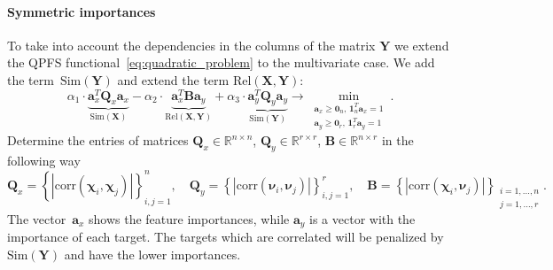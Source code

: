 \documentclass[12pt,twoside]{article}
\newcommand{\ba}{\mathbf{a}}
\newcommand{\bY}{\mathbf{Y}}
\newcommand{\bX}{\mathbf{X}}
\newcommand{\bB}{\mathbf{B}}
\newcommand{\bQ}{\mathbf{Q}}
\newcommand{\bbR}{\mathbb{R}}
\newcommand{\bchi}{\boldsymbol{\chi}}
\newcommand{\bnu}{\boldsymbol{\nu}}
\newcommand{\bOne}{\boldsymbol{1}}
\newcommand{\bZero}{\boldsymbol{0}}
\begin{document}
\paragraph{Symmetric importances}

To take into account the dependencies in the columns of the matrix $\bY$ we extend the QPFS functional~\eqref{eq:quadratic_problem} to the multivariate case. 
We add the term~$\text{Sim}(\bY)$ and extend the term $\text{Rel}(\bX, \bY)$:
\begin{equation}
	\alpha_1 \cdot \underbrace{\ba_x^T \bQ_x \ba_x}_{\text{Sim}(\bX)} - \alpha_2 \cdot \underbrace{\ba_x^T \bB \ba_y}_{\text{Rel}(\bX, \bY)} + \alpha_3 \cdot \underbrace{\ba_y^T \bQ_y \ba_y}_{\text{Sim}(\bY)} \rightarrow \min_{\substack{\ba_x \geq \bZero_n, \, \bOne_n^T\ba_x=1 \\ \ba_y \geq \bZero_r, \, \bOne_r^T\ba_y=1}}.
	\label{eq:multivariate_quadratic_problem}
\end{equation}
Determine the entries of matrices $\bQ_x \in \bbR^{n \times n}$, $\bQ_y \in \bbR^{r \times r}$, $\bB \in \bbR^{n \times r}$ in the following way
\begin{equation*}
	\bQ_x = \left\{ \left| \text{corr}(\bchi_i, \bchi_j) \right| \right\}_{i,j=1}^n, \quad 
	\bQ_y = \left\{ \left| \text{corr}(\bnu_i, \bnu_j) \right| \right\}_{i,j=1}^r, \quad
	\bB =  \left\{ \left| \text{corr}(\bchi_i, \bnu_j) \right| \right\}_{\substack{i=1, \dots, n \\ j=1, \dots, r}}.
\end{equation*}
The vector~$\ba_x$ shows the feature importances, while $\ba_y$ is a vector with the importance of each target. 
The targets which are correlated will be penalized by $\text{Sim} (\bY)$ and have the lower importances.  
\end{document}
